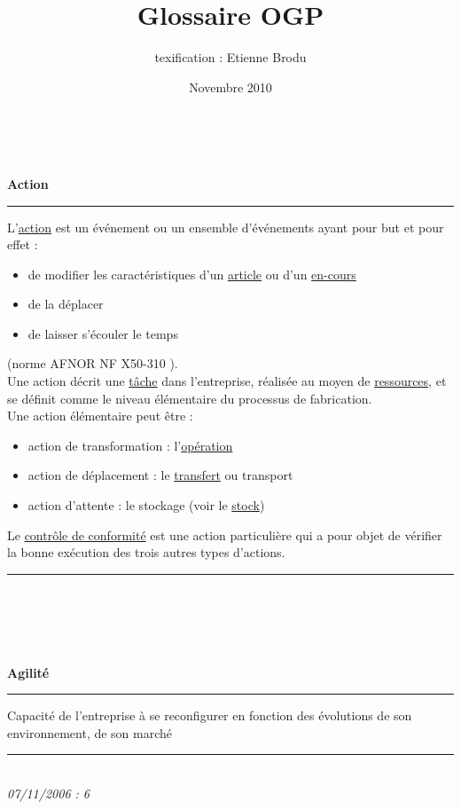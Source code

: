 \documentclass[12pt,a4paper,twoside]{article}
\title{Glossaire OGP}
\author{texification : Etienne Brodu}
\date{Novembre 2010}
\newcommand{\definition}[3]{
	\begin{minipage}{\textwidth}
		\textbf{\large{#1}}\\
		\rule{\textwidth}{0.5pt}
		#2\\
		\ifthenelse{\isempty{#3}}%
	    {}%
	    {\rule{\textwidth}{0.25pt}\\\textit{#3}}%
    \end{minipage}
    \\\\
}
\begin{document}
\maketitle
\newpage
~
\newpage

\definition{Action}
{
	L'\href{http://gpr.insa-lyon.fr/supgedem/Home/Le_monde_industriel/L_entreprise/Le_systeme_physique_de_production/actions.htm}{action} est un événement ou un ensemble d'événements ayant pour but et pour effet :
	\begin{itemize}
	\item de modifier les caractéristiques d'un \href{http://gpr.insa-lyon.fr/supgedem/Home/glossaire/garticle.htm}{article} ou d'un \href{http://gpr.insa-lyon.fr/supgedem/Home/Le_monde_industriel/L_entreprise/Le_systeme_physique_de_production/lencours.htm}{en-cours}
	\item de la déplacer
	\item de laisser s'écouler le temps
	\end{itemize}
	(norme AFNOR NF X50-310 ).\\
	Une action décrit une \href{http://gpr.insa-lyon.fr/supgedem/Home/glossaire/glestach.htm}{tâche} dans l'entreprise, réalisée au moyen de \href{http://gpr.insa-lyon.fr/supgedem/Home/Le_monde_industriel/L_entreprise/Le_systeme_physique_de_production/ressources.htm}{ressources}, et se définit comme le niveau élémentaire du processus de fabrication.\\
	Une action élémentaire peut être :
	\begin{itemize}
	\item action de transformation : l'\href{http://gpr.insa-lyon.fr/supgedem/Home/Le_monde_industriel/L_entreprise/Le_systeme_physique_de_production/actions.htm}{opération}
	\item action de déplacement : le \href{http://gpr.insa-lyon.fr/supgedem/Home/Le_monde_industriel/L_entreprise/Le_systeme_physique_de_production/letransfert.htm}{transfert} ou transport
	\item action d'attente : le stockage (voir le \href{http://gpr.insa-lyon.fr/supgedem/Home/Le_monde_industriel/L_entreprise/Le_systeme_physique_de_production/Le_stock/lestock.htm}{stock})
	\end{itemize}
	Le \href{http://gpr.insa-lyon.fr/supgedem/Home/glossaire/glecontroledeconformite.htm}{contrôle de conformité} est une action particulière qui a pour objet de vérifier la bonne exécution des trois autres types d'actions.
}{}

\definition{Agilité}
{
	Capacité de l'entreprise à se reconfigurer en fonction des évolutions de son environnement, de son marché
	}{07/11/2006 : 6}
\end{document}
